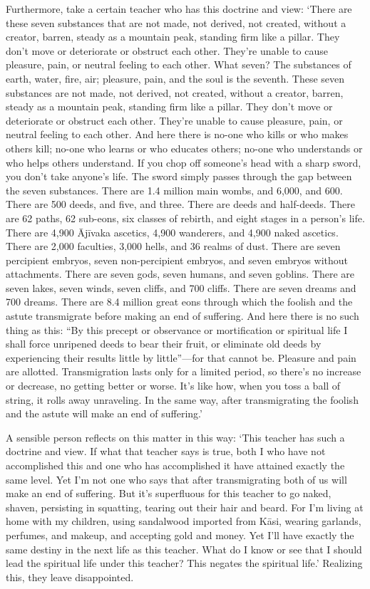 \documentclass[12pt,openany]{book}%
\begin{document}
Furthermore, take a certain teacher who has this doctrine and view: ‘There are these seven substances that are not made, not derived, not created, without a creator, barren, steady as a mountain peak, standing firm like a pillar. They don’t move or deteriorate or obstruct each other. They’re unable to cause pleasure, pain, or neutral feeling to each other. What seven? The substances of earth, water, fire, air; pleasure, pain, and the soul is the seventh. These seven substances are not made, not derived, not created, without a creator, barren, steady as a mountain peak, standing firm like a pillar. They don’t move or deteriorate or obstruct each other. They’re unable to cause pleasure, pain, or neutral feeling to each other. And here there is no-one who kills or who makes others kill; no-one who learns or who educates others; no-one who understands or who helps others understand. If you chop off someone’s head with a sharp sword, you don’t take anyone’s life. The sword simply passes through the gap between the seven substances. There are 1.4 million main wombs, and 6,000, and 600. There are 500 deeds, and five, and three. There are deeds and half-deeds. There are 62 paths, 62 sub-eons, six classes of rebirth, and eight stages in a person’s life. There are 4,900 \textsanskrit{Ājīvaka} ascetics, 4,900 wanderers, and 4,900 naked ascetics. There are 2,000 faculties, 3,000 hells, and 36 realms of dust. There are seven percipient embryos, seven non-percipient embryos, and seven embryos without attachments. There are seven gods, seven humans, and seven goblins. There are seven lakes, seven winds, seven cliffs, and 700 cliffs. There are seven dreams and 700 dreams. There are 8.4 million great eons through which the foolish and the astute transmigrate before making an end of suffering. And here there is no such thing as this: “By this precept or observance or mortification or spiritual life I shall force unripened deeds to bear their fruit, or eliminate old deeds by experiencing their results little by little”—for that cannot be. Pleasure and pain are allotted. Transmigration lasts only for a limited period, so there’s no increase or decrease, no getting better or worse. It’s like how, when you toss a ball of string, it rolls away unraveling. In the same way, after transmigrating the foolish and the astute will make an end of suffering.’ 

A sensible person reflects on this matter in this way: ‘This teacher has such a doctrine and view. If what that teacher says is true, both I who have not accomplished this and one who has accomplished it have attained exactly the same level. Yet I’m not one who says that after transmigrating both of us will make an end of suffering. But it’s superfluous for this teacher to go naked, shaven, persisting in squatting, tearing out their hair and beard. For I’m living at home with my children, using sandalwood imported from \textsanskrit{Kāsi}, wearing garlands, perfumes, and makeup, and accepting gold and money. Yet I’ll have exactly the same destiny in the next life as this teacher. What do I know or see that I should lead the spiritual life under this teacher? This negates the spiritual life.’ Realizing this, they leave disappointed. 
\end{document}
